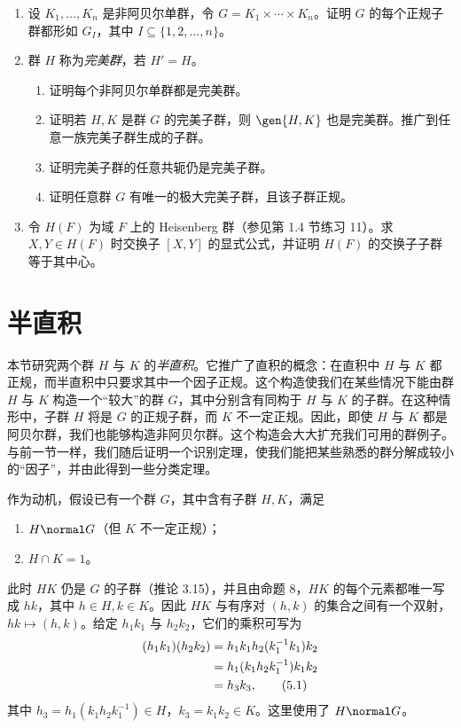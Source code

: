\begin{enumerate}[label=\arabic*.]
  \item 设 $K_1,
\ldots,K_n$ 是非阿贝尔单群，令 $G=K_1\times\cdots\times K_n$。证明 $G$ 的每个正规子群都形如 $G_I$，其中 $I\subseteq\{1,2,
\ldots,n\}$。
  \item 群 $H$ 称为\emph{完美群}，若 $H'=H$。
  \begin{enumerate}[label=(\alph*)]
    \item 证明每个非阿贝尔单群都是完美群。
    \item 证明若 $H,K$ 是群 $G$ 的完美子群，则 $\gen{H,K}$ 也是完美群。推广到任意一族完美子群生成的子群。
    \item 证明完美子群的任意共轭仍是完美子群。
    \item 证明任意群 $G$ 有唯一的极大完美子群，且该子群正规。
  \end{enumerate}
  \item 令 $H(F)$ 为域 $F$ 上的 Heisenberg 群（参见第 1.4 节练习 11）。求 $X,Y\in H(F)$ 时交换子 $[X,Y]$ 的显式公式，并证明 $H(F)$ 的交换子子群等于其中心。
\end{enumerate}

\section{半直积}

本节研究两个群 $H$ 与 $K$ 的\emph{半直积}。它推广了直积的概念：在直积中 $H$ 与 $K$ 都正规，而半直积中只要求其中一个因子正规。这个构造使我们在某些情况下能由群 $H$ 与 $K$ 构造一个“较大”的群 $G$，其中分别含有同构于 $H$ 与 $K$ 的子群。在这种情形中，子群 $H$ 将是 $G$ 的正规子群，而 $K$ 不一定正规。因此，即使 $H$ 与 $K$ 都是阿贝尔群，我们也能够构造非阿贝尔群。这个构造会大大扩充我们可用的群例子。与前一节一样，我们随后证明一个识别定理，使我们能把某些熟悉的群分解成较小的“因子”，并由此得到一些分类定理。

作为动机，假设已有一个群 $G$，其中含有子群 $H,K$，满足
\begin{enumerate}[label=(\alph*)]
  \item $H\normal G$（但 $K$ 不一定正规）；
  \item $H\cap K=1$。
\end{enumerate}
此时 $HK$ 仍是 $G$ 的子群（推论 3.15），并且由命题 8，$HK$ 的每个元素都唯一写成 $hk$，其中 $h\in H,k\in K$。因此 $HK$ 与有序对 $(h,k)$ 的集合之间有一个双射，$hk\mapsto(h,k)$。给定 $h_1k_1$ 与 $h_2k_2$，它们的乘积可写为
\begin{align}
(h_1k_1)(h_2k_2)
&=h_1k_1h_2(k_1^{-1}k_1)k_2\notag\\
&=h_1(k_1h_2k_1^{-1})k_1k_2\notag\\
&=h_3k_3, \tag{5.1}
\end{align}
其中 $h_3=h_1(k_1h_2k_1^{-1})\in H$，$k_3=k_1k_2\in K$。这里使用了 $H\normal G$。

